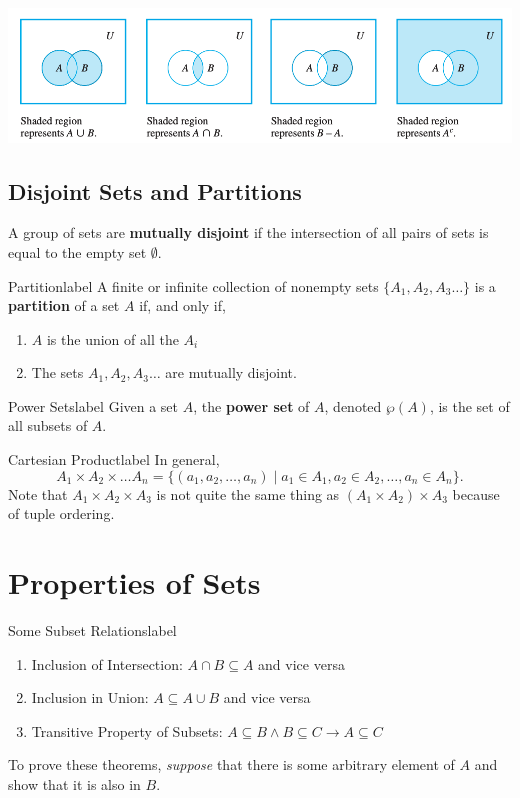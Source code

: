 \documentclass[a4paper]{report}
\begin{document}
\includegraphics[scale=0.65]{setops}

\subsection{Disjoint Sets and Partitions}

A group of sets are \textbf{mutually disjoint} if the intersection of all pairs of sets is equal to
the empty set $\emptyset$.

\begin{definition}{Partition}{label}
    A finite or infinite collection of nonempty sets $\{A_1, A_2, A_3 \ldots\}$ is a \textbf{partition}
    of a set $A$ if, and only if,
    \begin{enumerate}
        \item $A$ is the union of all the $A_i$
        \item The sets $A_1,A_2,A_3 \ldots$ are mutually disjoint.
    \end{enumerate}
\end{definition}

\begin{definition}{Power Sets}{label}
    Given a set $A$, the \textbf{power set} of $A$, denoted $\wp(A)$, is the set of all subsets of $A$.
\end{definition}

\begin{definition}{Cartesian Product}{label}
    In general, \[
        A_1 \times A_2 \times \ldots A_n = \{(a_1, a_2, \ldots , a_n)  \mid a_1 \in A_1, a_2 \in A_2, \ldots , a_n \in A_n \}
    .\] 
    Note that $A_1 \times A_2 \times A_3$ is not quite the same thing as $(A_1 \times  A_2) \times A_3$
    because of tuple ordering.
\end{definition}

\section{Properties of Sets}

\begin{theorem}{Some Subset Relations}{label}
    \begin{enumerate}
        \item Inclusion of Intersection: $A \cap B \subseteq A$ and vice versa
        \item Inclusion in Union: $A \subseteq A \cup B$ and vice versa
        \item Transitive Property of Subsets: $A \subseteq B \land B \subseteq C \to A \subseteq C$
    \end{enumerate}
    To prove these theorems, \emph{suppose} that there is some arbitrary element of $A$ and show
    that it is also in $B$.
\end{theorem}
\end{document}
